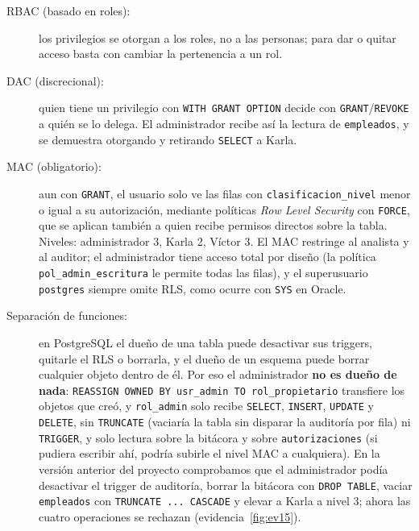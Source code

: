 \documentclass[12pt,a4paper]{article}
\begin{document}
\begin{description}
    \item[RBAC (basado en roles):] los privilegios se otorgan a los roles, no a las personas; para dar o quitar acceso basta con cambiar la pertenencia a un rol.
    \item[DAC (discrecional):] quien tiene un privilegio con \texttt{WITH GRANT OPTION} decide con \texttt{GRANT}/\texttt{REVOKE} a quién se lo delega. El administrador recibe así la lectura de \texttt{empleados}, y se demuestra otorgando y retirando \texttt{SELECT} a Karla.
    \item[MAC (obligatorio):] aun con \texttt{GRANT}, el usuario solo ve las filas con \texttt{clasificacion\_\allowbreak{}nivel} menor o igual a su autorización, mediante políticas \textit{Row Level Security} con \texttt{FORCE}, que se aplican también a quien recibe permisos directos sobre la tabla. Niveles: administrador 3, Karla 2, Víctor 3. El MAC restringe al analista y al auditor; el administrador tiene acceso total por diseño (la política \texttt{pol\_\allowbreak{}admin\_\allowbreak{}escritura} le permite todas las filas), y el superusuario \texttt{postgres} siempre omite RLS, como ocurre con \texttt{SYS} en Oracle.
    \item[Separación de funciones:] en PostgreSQL el dueño de una tabla puede desactivar sus triggers, quitarle el RLS o borrarla, y el dueño de un esquema puede borrar cualquier objeto dentro de él. Por eso el administrador \textbf{no es dueño de nada}: \texttt{REASSIGN OWNED BY usr\_\allowbreak{}admin TO rol\_\allowbreak{}propietario} transfiere los objetos que creó, y \texttt{rol\_\allowbreak{}admin} solo recibe \texttt{SELECT}, \texttt{INSERT}, \texttt{UPDATE} y \texttt{DELETE}, sin \texttt{TRUNCATE} (vaciaría la tabla sin disparar la auditoría por fila) ni \texttt{TRIGGER}, y solo lectura sobre la bitácora y sobre \texttt{autorizaciones} (si pudiera escribir ahí, podría subirle el nivel MAC a cualquiera). En la versión anterior del proyecto comprobamos que el administrador podía desactivar el trigger de auditoría, borrar la bitácora con \texttt{DROP TABLE}, vaciar \texttt{empleados} con \texttt{TRUNCATE ... CASCADE} y elevar a Karla a nivel 3; ahora las cuatro operaciones se rechazan (evidencia~\ref{fig:ev15}).
\end{description}
\end{document}
